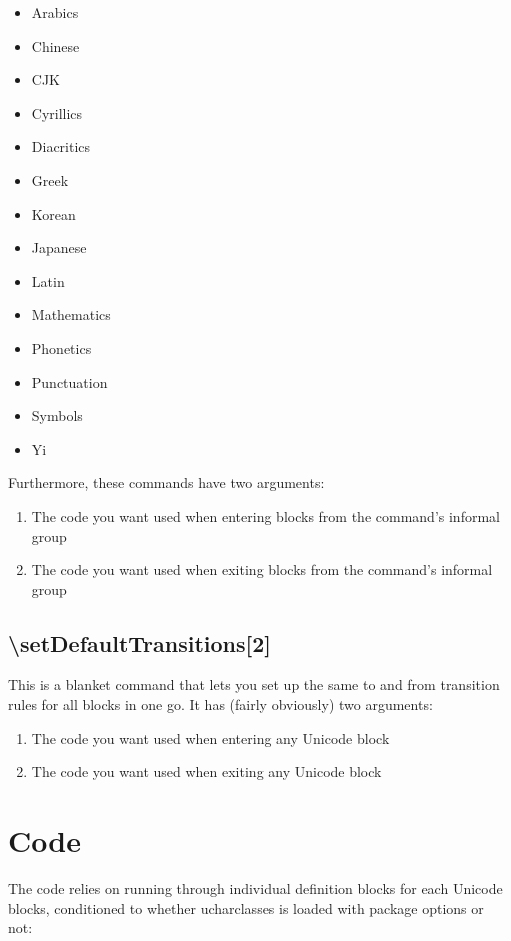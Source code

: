 ﻿\documentclass{article}
\newenvironment{itemlist}{%
  \begin{itemize}
	\setlength{\itemsep}{0pt}
	\setlength{\parsep}{0pt}
	\setlength{\topsep}{0pt}
	\setlength{\partopsep}{0pt}
	\setlength{\parskip}{0pt}
	\setlength{\labelsep}{5pt}}%
{
  \end{itemize}}
\newenvironment{numberlist}{%
  \begin{enumerate}
	\setlength{\itemsep}{0pt}
	\setlength{\parsep}{0pt}
	\setlength{\topsep}{0pt}
	\setlength{\partopsep}{0pt}
	\setlength{\parskip}{0pt}
	\setlength{\labelsep}{5pt}}%
{
  \end{enumerate}}
\begin{document}
			\begin{itemlist}
				\item Arabics
				\item Chinese
				\item CJK
				\item Cyrillics
				\item Diacritics
				\item Greek
				\item Korean
				\item Japanese
				\item Latin
				\item Mathematics
				\item Phonetics
				\item Punctuation
				\item Symbols
				\item Yi
			\end{itemlist}

			Furthermore, these commands have two arguments:

			\begin{numberlist}
				\item The code you want used when entering blocks from the command's informal group
				\item The code you want used when exiting blocks from the command's informal group
			\end{numberlist}

		\subsection{\textbackslash setDefaultTransitions[2]}

			This is a blanket command that lets you set up the same to and from transition rules for all blocks in one go. It has (fairly obviously) two arguments:

			\begin{numberlist}
				\item The code you want used when entering any Unicode block
				\item The code you want used when exiting any Unicode block
			\end{numberlist}

	\section{Code}

		The code relies on running through individual definition blocks for each Unicode blocks, conditioned to whether ucharclasses is loaded with package options or not:
\end{document}
